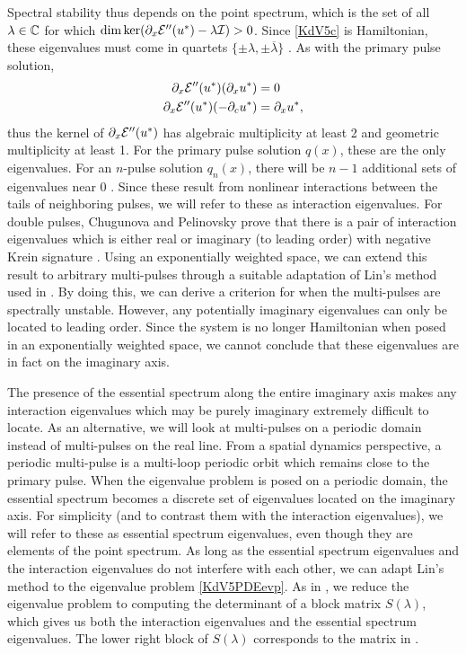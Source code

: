 \documentclass[11pt,reqno]{amsart}
\theoremstyle{plain}
\theoremstyle{definition}
\theoremstyle{remark}
\begin{document}
Spectral stability thus depends on the point spectrum, which is the set of all $\lambda \in \mathbb{C}$ for which $\mathop\mathrm{dim}\nolimits \mathop\mathrm{ker}\nolimits(\partial_x \mathcal{E}''(u^*) - \lambda \mathcal{I}) > 0$. Since \cref{KdV5c} is Hamiltonian, these eigenvalues must come in quartets $\{ \pm \lambda, \pm \overline{\lambda}\}$ \cite[Proposition 5.1.2]{Kapitula2013}. As with the primary pulse solution,
\begin{align*}
\partial_x \mathcal{E}''(u^*) (\partial_x u^*) &= 0 \\
\partial_x \mathcal{E}''(u^*) (-\partial_c u^*) &= \partial_x u^*,
\end{align*}
thus the kernel of $\partial_x \mathcal{E}''(u^*)$ has algebraic multiplicity at least 2 and geometric multiplicity at least 1. For the primary pulse solution $q(x)$, these are the only eigenvalues. For an $n$-pulse solution $q_n(x)$, there will be $n-1$ additional sets of eigenvalues near 0 \cite{Sandstede1998}. Since these result from nonlinear interactions between the tails of neighboring pulses, we will refer to these as interaction eigenvalues. For double pulses, Chugunova and Pelinovsky prove that there is a pair of interaction eigenvalues which is either real or imaginary (to leading order) with negative Krein signature \cite[Theorem 2.3]{Pelinovsky2007}. Using an exponentially weighted space, we can extend this result to arbitrary multi-pulses through a suitable adaptation of Lin's method used in \cite{Sandstede1998}. By doing this, we can derive a criterion for when the multi-pulses are spectrally unstable. However, any potentially imaginary eigenvalues can only be located to leading order. Since the system is no longer Hamiltonian when posed in an exponentially weighted space, we cannot conclude that these eigenvalues are in fact on the imaginary axis.

The presence of the essential spectrum along the entire imaginary axis makes any interaction eigenvalues which may be purely imaginary extremely difficult to locate. As an alternative, we will look at multi-pulses on a periodic domain instead of multi-pulses on the real line. From a spatial dynamics perspective, a periodic multi-pulse is a multi-loop periodic orbit which remains close to the primary pulse. When the eigenvalue problem is posed on a periodic domain, the essential spectrum becomes a discrete set of eigenvalues located on the imaginary axis. For simplicity (and to contrast them with the interaction eigenvalues), we will refer to these as essential spectrum eigenvalues, even though they are elements of the point spectrum. As long as the essential spectrum eigenvalues and the interaction eigenvalues do not interfere with each other, we can adapt Lin's method to the eigenvalue problem \cref{KdV5PDEevp}. As in \cite{Sandstede1998}, we reduce the eigenvalue problem to computing the determinant of a block matrix $S(\lambda)$, which gives us both the interaction eigenvalues and the essential spectrum eigenvalues. The lower right block of $S(\lambda)$ corresponds to the matrix in \cite[Theorem 2]{Sandstede1998}.
\end{document}
